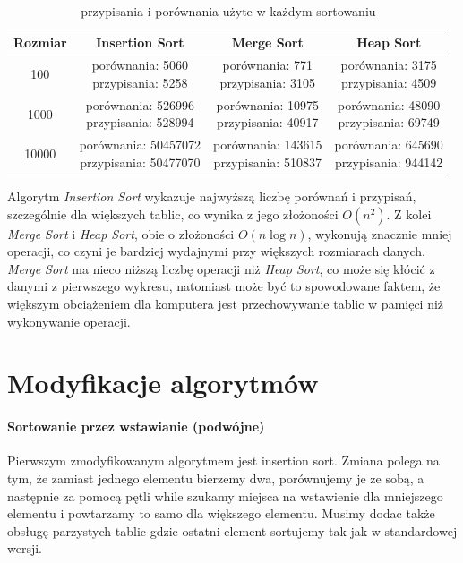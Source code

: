 \documentclass{article}
\begin{document}
	\begin{table}[H]
		\raggedright
		\begin{tabular}{|c|c|c|c|}
			\hline
			\textbf{Rozmiar} & \textbf{Insertion Sort} & \textbf{Merge Sort} & \textbf{Heap Sort} \\ \hline
			100 & \makecell{porównania: 5060 \\ przypisania: 5258} & \makecell{porównania: 771 \\ przypisania: 3105} & \makecell{porównania: 3175 \\ przypisania: 4509} \\ \hline
			1000 & \makecell{porównania: 526996 \\ przypisania: 528994} & \makecell{porównania: 10975 \\ przypisania: 40917} & \makecell{porównania: 48090 \\ przypisania: 69749} \\ \hline
			10000 & \makecell{porównania: 50457072 \\ przypisania: 50477070} & \makecell{porównania: 143615 \\ przypisania: 510837} & \makecell{porównania: 645690 \\ przypisania: 944142} \\ \hline
		\end{tabular}
		\caption{przypisania i porównania użyte w każdym sortowaniu}
	\end{table}
	
	Algorytm \textit{Insertion Sort} wykazuje najwyższą liczbę porównań i przypisań, szczególnie dla większych tablic, co wynika z jego złożoności $O(n^2)$. Z kolei \textit{Merge Sort} i \textit{Heap Sort}, obie o złożoności $O(n \log n)$, wykonują znacznie mniej operacji, co czyni je bardziej wydajnymi przy większych rozmiarach danych. \textit{Merge Sort} ma nieco niższą liczbę operacji niż \textit{Heap Sort}, co może się kłócić z danymi z pierwszego wykresu, natomiast może być to spowodowane faktem, że większym obciążeniem dla komputera jest przechowywanie tablic w pamięci niż wykonywanie operacji. 
	
	\newpage
	\section{Modyfikacje algorytmów}
	\paragraph{Sortowanie przez wstawianie (podwójne)\\}
	Pierwszym zmodyfikowanym algorytmem jest insertion sort. Zmiana polega na tym, że zamiast jednego elementu bierzemy dwa, porównujemy je ze sobą, a następnie za pomocą pętli while szukamy miejsca na wstawienie dla mniejszego elementu i powtarzamy to samo dla większego elementu. Musimy dodac także obsługę parzystych tablic gdzie ostatni element sortujemy tak jak w standardowej wersji.
	
\end{document}
